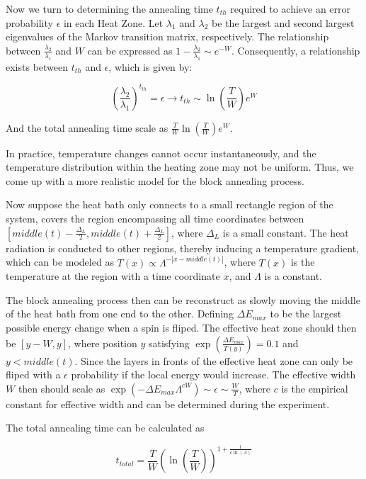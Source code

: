 \documentclass[twocolumn,superscriptaddress,english,showpacs,longbibliography]{revtex4-2}
\begin{document}
Now we turn to determining the annealing time $t_{th}$ required to achieve an error probability $\epsilon$ in each Heat Zone. Let $\lambda_1$ and $\lambda_2$ be the largest and second largest eigenvalues of the Markov transition matrix, respectively. The relationship between $\frac{\lambda_2}{\lambda_1}$ and $W$ can be expressed as $1 - \frac{\lambda_2}{\lambda_1} \sim e^{-W}$. Consequently, a relationship exists between $t_{th}$ and $\epsilon$, which is given by:

\begin{equation}
    \left( \frac{\lambda_2}{\lambda_1} \right) ^ {t_{th}} = \epsilon \rightarrow t_{th} \sim \ln(\frac{T}{W})e^{W}
\end{equation}

And the total annealing time scale as $\frac{T}{W}\ln(\frac{T}{W})e^W$.

In practice, temperature changes cannot occur instantaneously, and the temperature distribution within the heating zone may not be uniform.
Thus, we come up with a more realistic model for the block annealing process.

Now suppose the heat bath only connects to a small rectangle region of the system,
covers the region encompassing all time coordinates between $[middle(t)-\frac{\Delta_L}{2}, middle(t)+\frac{\Delta_L}{2}]$, where $\Delta_L$ is a small constant.
The heat radiation is conducted to other regions, thereby inducing a temperature gradient,
which can be modeled as $T(x) \propto \Lambda^{-|x - middle(t)|}$, where $T(x)$ is the temperature at the region with a time coordinate $x$, and $\Lambda$ is a constant.

The block annealing process then can be reconstruct as slowly moving
the middle of the heat bath from one end to the other. Defining $\Delta E_{max}$ to be the
largest possible energy change when a spin is fliped.
The effective heat zone should then be $[y-W, y]$, where position $y$ satisfying 
$\exp(\frac{\Delta E_{max}}{T(y)}) = 0.1$ and $y<middle(t)$. Since the layers
in fronts of the effective heat zone can only be fliped with a $\epsilon$ probability if the local energy would increase. 
The effective width $W$ then should scale as $\exp(-\Delta E_{max} \Lambda^{cW}) \sim \epsilon \sim \frac{W}{T}$, where $c$ is the empirical constant for effective width and can be determined during the experiment. 

The total annealing time can be calculated as 

\begin{equation}
    \label{eq:total-annealing-time}
    t_{total} = \frac{T}{W}(\ln(\frac{T}{W}))^{1+ \frac{1}{c\ln(\Lambda)}}
\end{equation}
\end{document}
